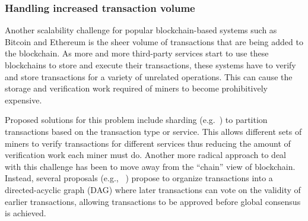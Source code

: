 \subsubsection{Handling increased transaction volume}
Another scalability challenge for popular blockchain-based systems such as Bitcoin and Ethereum is the sheer volume of transactions that are being added to the blockchain.  As more and more third-party services start to use these blockchains to store and execute their transactions, these systems have to verify and store transactions for a variety of unrelated operations. This can cause the storage and verification work required of miners to become prohibitively expensive.

Proposed solutions for this problem include sharding (e.g.~\cite{CCS:LNZBGS16, FC:GenRenSir17}) to partition transactions based on the transaction type or service.
This allows different sets of miners to verify transactions for different services thus reducing the amount of verification work each miner must do.  Another more radical approach to deal with this challenge has been to move away from the ``chain'' view of blockchain.  Instead, several proposals (e.g., ~\cite{ePrint:SomLewZoh16,eprint:SomZoh18,IOTA}) propose to organize transactions into a directed-acyclic graph (DAG) where later transactions can vote on the validity of earlier transactions, allowing transactions to be approved before global consensus is achieved.
%
